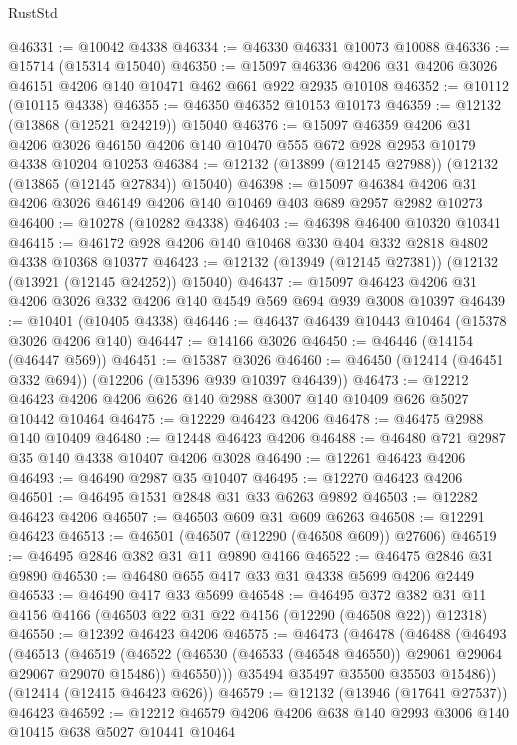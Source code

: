 \begin{lexlean}{RustStd}
\begin{coremodule}
@46331 := @10042 @4338
@46334 := @46330 @46331 @10073 @10088
@46336 := @15714 (@15314 @15040)
@46350 := @15097 @46336 @4206 @31 @4206 @3026 @46151 @4206 @140 @10471 @462 @661 @922 @2935 @10108
@46352 := @10112 (@10115 @4338)
@46355 := @46350 @46352 @10153 @10173
@46359 := @12132 (@13868 (@12521 @24219)) @15040
@46376 := @15097
    @46359
    @4206
    @31
    @4206
    @3026
    @46150
    @4206
    @140
    @10470
    @555
    @672
    @928
    @2953
    @10179
    @4338
    @10204
    @10253
@46384 := @12132 (@13899 (@12145 @27988)) (@12132 (@13865 (@12145 @27834)) @15040)
@46398 := @15097 @46384 @4206 @31 @4206 @3026 @46149 @4206 @140 @10469 @403 @689 @2957 @2982 @10273
@46400 := @10278 (@10282 @4338)
@46403 := @46398 @46400 @10320 @10341
@46415 := @46172 @928 @4206 @140 @10468 @330 @404 @332 @2818 @4802 @4338 @10368 @10377
@46423 := @12132 (@13949 (@12145 @27381)) (@12132 (@13921 (@12145 @24252)) @15040)
@46437 := @15097 @46423 @4206 @31 @4206 @3026 @332 @4206 @140 @4549 @569 @694 @939 @3008 @10397
@46439 := @10401 (@10405 @4338)
@46446 := @46437 @46439 @10443 @10464 (@15378 @3026 @4206 @140)
@46447 := @14166 @3026
@46450 := @46446 (@14154 (@46447 @569))
@46451 := @15387 @3026
@46460 := @46450 (@12414 (@46451 @332 @694)) (@12206 (@15396 @939 @10397 @46439))
@46473 := @12212 @46423 @4206 @4206 @626 @140 @2988 @3007 @140 @10409 @626 @5027 @10442 @10464
@46475 := @12229 @46423 @4206
@46478 := @46475 @2988 @140 @10409
@46480 := @12448 @46423 @4206
@46488 := @46480 @721 @2987 @35 @140 @4338 @10407 @4206 @3028
@46490 := @12261 @46423 @4206
@46493 := @46490 @2987 @35 @10407
@46495 := @12270 @46423 @4206
@46501 := @46495 @1531 @2848 @31 @33 @6263 @9892
@46503 := @12282 @46423 @4206
@46507 := @46503 @609 @31 @609 @6263
@46508 := @12291 @46423
@46513 := @46501 (@46507 (@12290 (@46508 @609)) @27606)
@46519 := @46495 @2846 @382 @31 @11 @9890 @4166
@46522 := @46475 @2846 @31 @9890
@46530 := @46480 @655 @417 @33 @31 @4338 @5699 @4206 @2449
@46533 := @46490 @417 @33 @5699
@46548 := @46495
    @372
    @382
    @31
    @11
    @4156
    @4166
    (@46503 @22 @31 @22 @4156 (@12290 (@46508 @22)) @12318)
@46550 := @12392 @46423 @4206
@46575 := @46473
    (@46478
      (@46488
        (@46493
          (@46513
            (@46519
              (@46522 (@46530 (@46533 (@46548 @46550)) @29061 @29064 @29067 @29070 @15486))
              @46550)))
        @35494
        @35497
        @35500
        @35503
        @15486))
    (@12414 (@12415 @46423 @626))
@46579 := @12132 (@13946 (@17641 @27537)) @46423
@46592 := @12212 @46579 @4206 @4206 @638 @140 @2993 @3006 @140 @10415 @638 @5027 @10441 @10464

\end{coremodule}
\end{lexlean}
